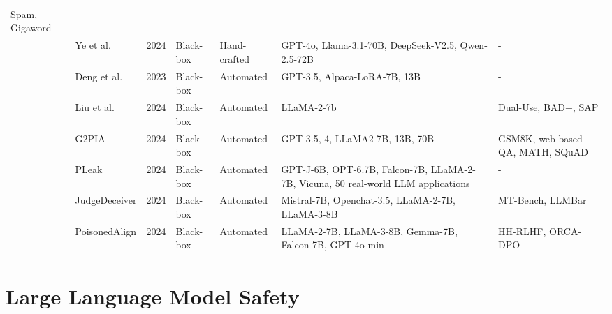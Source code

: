 \begin{table*}[htp]
{\begin{tabular}{p{}p{}p{}p{}p{}p{}p{}}
Spam, Gigaword \\
& \cellcolor{gray!15!}Ye et al. \cite{ye2024we} & \cellcolor{gray!15!}2024 & \cellcolor{gray!15!}Black-box & \cellcolor{gray!15!}Hand-crafted & \cellcolor{gray!15!}GPT-4o, Llama-3.1-70B, DeepSeek-V2.5, Qwen-2.5-72B & \cellcolor{gray!15!}- \\
& \cellcolor{white}Deng et al.~\cite{deng2023attack} & \cellcolor{white}2023 & \cellcolor{white}Black-box & \cellcolor{white}Automated & \cellcolor{white}GPT-3.5, Alpaca-LoRA-7B, 13B & \cellcolor{white}-  \\
& \cellcolor{gray!15!}Liu et al.~\cite{liu2024automatic} & \cellcolor{gray!15!}2024 & \cellcolor{gray!15!}Black-box & \cellcolor{gray!15!}Automated & \cellcolor{gray!15!}LLaMA-2-7b & \cellcolor{gray!15!}Dual-Use, BAD+, SAP \\
& \cellcolor{white}G2PIA~\cite{zhang2024goal} & \cellcolor{white}2024 & \cellcolor{white}Black-box & \cellcolor{white}Automated & \cellcolor{white}GPT-3.5, 4, LLaMA2-7B, 13B, 70B & \cellcolor{white}GSM8K, web-based QA, MATH, SQuAD \\
& \cellcolor{gray!15!}PLeak\cite{hui2024pleak} & \cellcolor{gray!15!}2024 & \cellcolor{gray!15!}Black-box & \cellcolor{gray!15!}Automated &\cellcolor{gray!15!}GPT-J-6B, OPT-6.7B, Falcon-7B,
LLaMA-2-7B, Vicuna, 50 real-world LLM applications  &\cellcolor{gray!15!}- \\
& \cellcolor{white}JudgeDeceiver\cite{shi2024optimization} & \cellcolor{white}2024 & \cellcolor{white}Black-box & \cellcolor{white}Automated & \cellcolor{white}Mistral-7B, Openchat-3.5,
LLaMA-2-7B, LLaMA-3-8B & \cellcolor{white}MT-Bench, LLMBar \\
& \cellcolor{gray!15!}PoisonedAlign\cite{shao2024making} & \cellcolor{gray!15!}2024 & \cellcolor{gray!15!}Black-box & \cellcolor{gray!15!}Automated & \cellcolor{gray!15!} LLaMA-2-7B, LLaMA-3-8B, Gemma-7B, Falcon-7B, GPT-4o min & \cellcolor{gray!15!} HH-RLHF, ORCA-DPO \\
\hline
\end{tabular}
}
\end{table*}



\section{Large Language Model Safety} \label{sec:llm}

